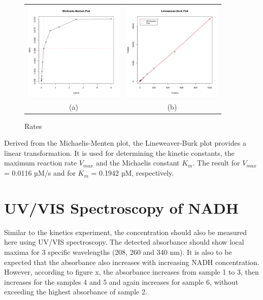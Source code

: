 \documentclass[a4paper,11pt]{article}
\begin{document}
                \begin{figure}[H]
                    \centering
                    \begin{tabular}{cc}
                        \includegraphics[width=180px]{../resources/kinetics_mmplot.png} &
                        \includegraphics[width=180px]{../resources/kinetics_lbplot.png} \\
                        (a) & (b)\\
                    \end{tabular}
                    \caption{Rates}\label{fig:mm_plot}
                \end{figure}

                Derived from the Michaelis-Menten plot, the Lineweaver-Burk plot provides a linear 
                transformation. It is used for determining the kinetic constants, the maximum reaction 
                rate $V_{max}$ and the Michaelis constant $K_m$. The result for $V_{max}$ = 0.0116 µM/s and for 
                $K_m$ = 0.1942 µM, respectively.

    \pagebreak

    \section{UV/VIS Spectroscopy of NADH}
    Similar to the kinetics experiment, the concentration should also be measured here using UV/VIS spectroscopy.
    The detected absorbance should show local maxima for 3 specific wavelengths (208, 260 and 340 nm). It is also to be expected that the absorbance also increases with increasing NADH concentration. However, according to figure x, the absorbance increases from sample 1 to 3, then increases for the samples 4 and 5 and again increases for sample 6, without exceeding the highest absorbance of sample 2. 
\end{document}
